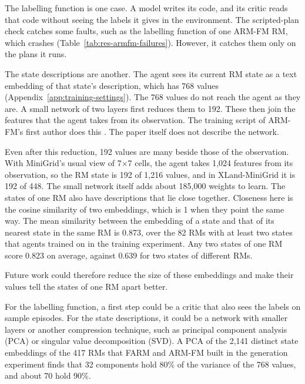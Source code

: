 \documentclass[11pt,english,listoffigures,listoftables]{tfgetsinf}
\begin{document}
The labelling function is one case. A model writes its code, and its critic reads that code without seeing the labels it gives in the environment. The scripted-plan check catches some faults, such as the labelling function of one ARM-FM RM, which crashes (Table~\ref{tab:res-armfm-failures}). However, it catches them only on the plans it runs. 

The state descriptions are another. The agent sees its current RM state as a text embedding of that state's description, which has 768 values (Appendix~\ref{app:training-settings}). The 768 values do not reach the agent as they are. A small network of two layers first reduces them to 192. These then join the features that the agent takes from its observation. The training script of ARM-FM's first author does this \cite{armfm_code}. The paper itself does not describe the network.

Even after this reduction, 192 values are many beside those of the observation. With MiniGrid's usual view of 7$\times$7 cells, the agent takes 1,024 features from its observation, so the RM state is 192 of 1,216 values, and in XLand-MiniGrid it is 192 of 448. The small network itself adds about 185,000 weights to learn. The states of one RM also have descriptions that lie close together. Closeness here is the cosine similarity of two embeddings, which is 1 when they point the same way. The mean similarity between the embedding of a state and that of its nearest state in the same RM is 0.873, over the 82 RMs with at least two states that agents trained on in the training experiment. Any two states of one RM score 0.823 on average, against 0.639 for two states of different RMs.

Future work could therefore reduce the size of these embeddings and make their values tell the states of one RM apart better.

For the labelling function, a first step could be a critic that also sees the labels on sample episodes. For the state descriptions, it could be a network with smaller layers or another compression technique, such as principal component analysis (PCA) or singular value decomposition (SVD). A PCA of the 2,141 distinct state embeddings of the 417 RMs that FARM and ARM-FM built in the generation experiment finds that 32 components hold 80\% of the variance of the 768 values, and about 70 hold 90\%.

\end{document}

